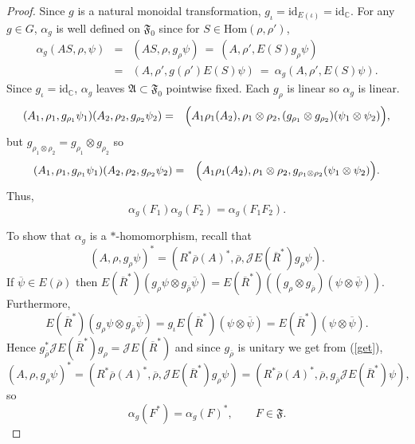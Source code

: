 \documentclass[11pt]{article}
\newcommand{\alg}[1]{\mathfrak{#1}}
\theoremstyle{definition}
\theoremstyle{definition}
\theoremstyle{remark}
\def\2#1{{\mathcal #1}}
\def\7#1{{\mathbb #1}}
\def\ol#1{{\overline #1}}
\newcommand{\Hom}{\mathrm{Hom}}
\def\id{\mathrm{id}}
\begin{document}
\begin{proof} Since $g$ is a natural monoidal transformation, $g _\iota =\id
  _{E(\iota )}=\id _{\7C }$.  For any $g\in G$, $\alpha _g$ is well defined on
  $\alg{F}_0$ since for $S\in \Hom (\rho ,\rho ')$,
  \begin{eqnarray*} \alpha _g(AS,\rho ,\psi )&=& (AS,\rho ,g_\rho \psi ) \:=\:
    (A,\rho ', E(S)g_\rho \psi ) \\
    &=& (A,\rho ', g(\rho ')E(S)\psi ) \: =\: \alpha _g(A,\rho ',E(S)\psi ).
  \end{eqnarray*} Since $g _\iota =\id _{\7C}$, $\alpha _g$ leaves $\alg{A}\subset
  \alg{F}_0$ pointwise fixed.  Each $g_\rho $ is linear so $\alpha _g$ is linear.
  \begin{eqnarray*} (A_1,\rho _1,g _{\rho _1}\psi _1)(A_2,\rho _2,g_{\rho _2}\psi _2)
    &=& \Bigl( A_1\rho _1(A_2),\rho _1\otimes \rho _2,(g _{\rho _1}\otimes g_{\rho
      _2})(\psi _1\otimes \psi _2) \Bigr) ,\end{eqnarray*} but $g_{\rho _1\otimes
    \rho _2}=g_{\rho _1}\otimes g_{\rho _2}$ so
  \begin{eqnarray*} (A_1,\rho _1,g_{\rho _1}\psi _1)(A_2,\rho _2,g_{\rho _2}\psi _2)
    &=& \Bigl( A_1\rho _1(A_2),\rho _1\otimes \rho _2,g_{\rho _1\otimes \rho _2}(\psi
    _1\otimes \psi _2) \Bigr) .\end{eqnarray*} Thus,
  \begin{equation} \label{homo} \alpha _g(F_1)\alpha _g(F_2)=\alpha _g(F_1F_2)
    .\end{equation}

To show that $\alpha _g$ is a $*$-homomorphism, recall that
\begin{equation} (A,\rho ,g_\rho \psi )^*=(R^*\ol\rho (A)^*,\ol\rho ,\2JE(\ol
  R^*)g_\rho \psi ).\label{get} \end{equation} If $\ol\psi \in E(\ol\rho )$ then
$E(\ol R^*)(g_\rho \psi \otimes g_{\ol\rho }\ol\psi )=E(\ol R^*)((g_\rho \otimes
g_{\ol\rho})(\psi \otimes \ol\psi ))$.  Furthermore,
$$ E(\ol R^*)(g_\rho \psi \otimes g _{\ol\rho }\ol\psi )=g _\iota E(\ol R^*)(\psi
\otimes \ol\psi )=E(\ol R^*)(\psi \otimes \ol\psi ).$$ Hence $g _{\ol \rho
}^*\2JE(\ol R^*)g_\rho =\2JE(\ol R^*)$ and since $g _{\ol\rho }$ is unitary we get
from (\ref{get}),
$$ (A,\rho ,g_\rho \psi )^*=(R^*\ol\rho (A)^*,\ol\rho ,\2JE(\ol R^*)g_\rho \psi )=(R^*\ol\rho
(A)^*,\ol\rho ,g _{\ol\rho }\2JE(\ol R^*)\psi ) ,$$ so \begin{equation} \alpha
  _g(F^*)=\alpha _g(F)^* ,\qquad F\in \alg{F}. \label{star} \end{equation}


\end{proof}
\end{document}
